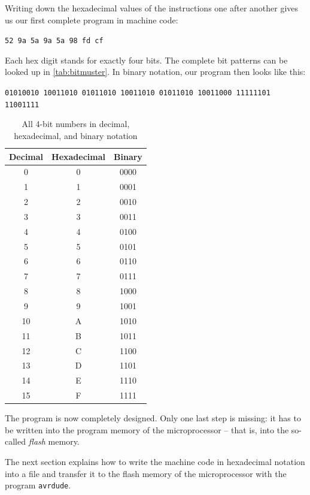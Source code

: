 \documentclass[a4paper,12pt]{article}
\begin{document}
\noindent
Writing down the hexadecimal values of the instructions one after another
gives us our first complete program in machine code:
\begin{center}
    \texttt{52 9a 5a 9a 5a 98 fd cf}
\end{center}
Each hex digit stands for exactly four bits. The complete bit patterns can be
looked up in \autoref{tab:bitmuster}. In binary notation, our program then
looks like this:
\begin{center}
    \texttt{01010010 10011010 01011010 10011010 01011010 10011000 11111101 11001111}
\end{center}

\begin{table}[ht]
    \centering
    \caption{All 4-bit numbers in decimal, hexadecimal, and binary notation}
    \label{tab:bitmuster}
    \begin{tabular}{c c c}
        \textbf{Decimal} & \textbf{Hexadecimal} & \textbf{Binary} \\
        \hline
         0 & 0  & 0000 \\
         1 & 1  & 0001 \\
         2 & 2  & 0010 \\
         3 & 3  & 0011 \\
         4 & 4  & 0100 \\
         5 & 5  & 0101 \\
         6 & 6  & 0110 \\
         7 & 7  & 0111 \\
         8 & 8  & 1000 \\
         9 & 9  & 1001 \\
        10 & A  & 1010 \\
        11 & B  & 1011 \\
        12 & C  & 1100 \\
        13 & D  & 1101 \\
        14 & E  & 1110 \\
        15 & F  & 1111 \\
    \end{tabular}
\end{table}

\noindent
The program is now completely designed. Only one last step is missing: it has
to be written into the program memory of the microprocessor – that is, into
the so-called \emph{flash} memory.

\noindent
The next section explains how to write the machine code in hexadecimal
notation into a file and transfer it to the flash memory of the
microprocessor with the program \texttt{avrdude}.
\end{document}
